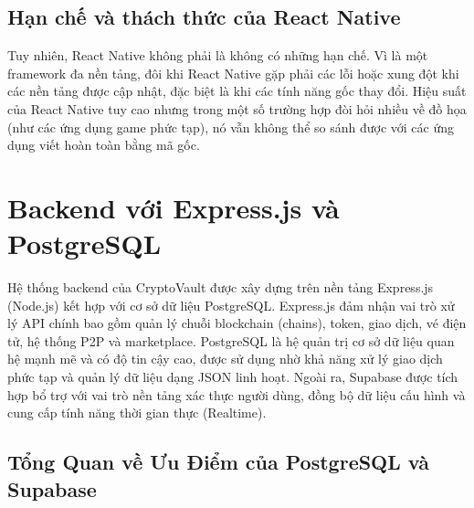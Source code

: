 \documentclass[a4paper]{report}
\begin{document}
\subsection{Hạn chế và thách thức của React Native}

Tuy nhiên, React Native không phải là không có những hạn chế. Vì là một framework đa nền tảng, đôi khi React Native gặp phải các lỗi hoặc xung đột khi các nền tảng được cập nhật, đặc biệt là khi các tính năng gốc thay đổi. Hiệu suất của React Native tuy cao nhưng trong một số trường hợp đòi hỏi nhiều về đồ họa (như các ứng dụng game phức tạp), nó vẫn không thể so sánh được với các ứng dụng viết hoàn toàn bằng mã gốc.

\section{Backend với Express.js và PostgreSQL}

Hệ thống backend của CryptoVault được xây dựng trên nền tảng Express.js (Node.js) kết hợp với cơ sở dữ liệu PostgreSQL. Express.js đảm nhận vai trò xử lý API chính bao gồm quản lý chuỗi blockchain (chains), token, giao dịch, vé điện tử, hệ thống P2P và marketplace. PostgreSQL là hệ quản trị cơ sở dữ liệu quan hệ mạnh mẽ và có độ tin cậy cao, được sử dụng nhờ khả năng xử lý giao dịch phức tạp và quản lý dữ liệu dạng JSON linh hoạt. Ngoài ra, Supabase được tích hợp bổ trợ với vai trò nền tảng xác thực người dùng, đồng bộ dữ liệu cấu hình và cung cấp tính năng thời gian thực (Realtime).

\subsection{Tổng Quan về Ưu Điểm của PostgreSQL và Supabase}
\end{document}
